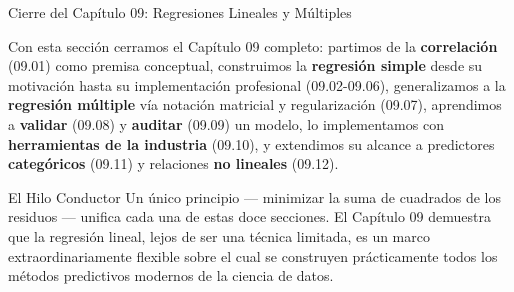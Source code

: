 \documentclass[10pt, aspectratio=169]{beamer}
\begin{document}
\begin{frame}{Cierre del Capítulo 09: Regresiones Lineales y Múltiples}
  \scriptsize
  \begin{retoclase}
    Con esta sección cerramos el Capítulo 09 completo: partimos de la \textbf{correlación} (09.01) como premisa conceptual, construimos la \textbf{regresión simple} desde su motivación hasta su implementación profesional (09.02-09.06), generalizamos a la \textbf{regresión múltiple} vía notación matricial y regularización (09.07), aprendimos a \textbf{validar} (09.08) y \textbf{auditar} (09.09) un modelo, lo implementamos con \textbf{herramientas de la industria} (09.10), y extendimos su alcance a predictores \textbf{categóricos} (09.11) y relaciones \textbf{no lineales} (09.12).
  \end{retoclase}

  \vspace{0.08cm}
  \pause
  \begin{alertblock}{El Hilo Conductor}
    Un único principio --- minimizar la suma de cuadrados de los residuos --- unifica cada una de estas doce secciones. El Capítulo 09 demuestra que la regresión lineal, lejos de ser una técnica limitada, es un marco extraordinariamente flexible sobre el cual se construyen prácticamente todos los métodos predictivos modernos de la ciencia de datos.
  \end{alertblock}
\end{frame}
\end{document}
